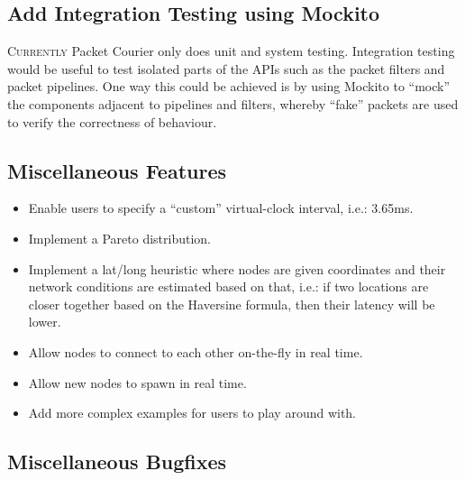 \subsection{Add Integration Testing using Mockito}\label{subsection:add_integration_testing_using_mockito}

\lettrine{C}{urrently} Packet Courier only does unit and system testing. Integration testing would be useful to test
isolated parts of the APIs such as the packet filters and packet pipelines. One way this could be achieved is by using
Mockito\cite{mockito} to ``mock'' the components adjacent to pipelines and filters, whereby ``fake'' packets are used
to verify the correctness of behaviour.

\subsection{Miscellaneous Features}\label{subsection:miscellaneous_features}

\begin{itemize}
    \item Enable users to specify a ``custom'' virtual-clock interval, i.e.: 3.65ms.
    \item Implement a Pareto distribution.
    \item Implement a lat/long heuristic where nodes are given coordinates and their network conditions are estimated
    based on that, i.e.: if two locations are closer together based on the Haversine formula\cite{haversine_formula},
    then their latency will be lower.
    \item Allow nodes to connect to each other on-the-fly in real time.
    \item Allow new nodes to spawn in real time.
    \item Add more complex examples for users to play around with.
\end{itemize}

\subsection{Miscellaneous Bugfixes}\label{subsection:miscellaneous_bugfixes}

